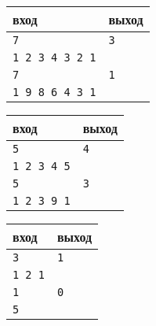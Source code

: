 \documentclass[10pt]{article}
\begin{document}
\begin{multicols}{3}
\begin{center}
\begin{tabular}{ l | l }
 вход & выход \\ \hline
 \texttt{7} & \texttt{3}  \\  
 \texttt{1 2 3 4 3 2 1} & \\\hline
 \texttt{7} & \texttt{1}  \\  
 \texttt{1 9 8 6 4 3 1} & \\
\end{tabular}
\end{center}

\begin{center}
\begin{tabular}{ l | l }
 вход & выход \\ \hline
 \texttt{5} & \texttt{4}  \\  
 \texttt{1 2 3 4 5} & \\ \hline
 \texttt{5} & \texttt{3}  \\  
 \texttt{1 2 3 9 1} & \\
\end{tabular}
\end{center}

\begin{center}
\begin{tabular}{ l | l }
 вход & выход \\ \hline
 \texttt{3} & \texttt{1}  \\  
 \texttt{1 2 1} & \\ \hline
 \texttt{1} & \texttt{0}  \\  
 \texttt{5} & \\
\end{tabular}
\end{center}
\end{multicols}
\end{document}
